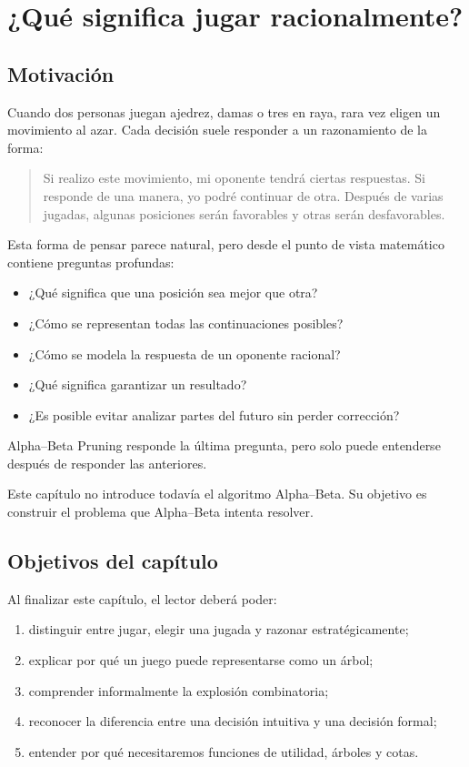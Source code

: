 \chapter{¿Qué significa jugar racionalmente?}

\section{Motivación}

Cuando dos personas juegan ajedrez, damas o tres en raya, rara vez eligen un movimiento al azar. Cada decisión suele responder a un razonamiento de la forma:

\begin{quote}
Si realizo este movimiento, mi oponente tendrá ciertas respuestas. Si responde de una manera, yo podré continuar de otra. Después de varias jugadas, algunas posiciones serán favorables y otras serán desfavorables.
\end{quote}

Esta forma de pensar parece natural, pero desde el punto de vista matemático contiene preguntas profundas:

\begin{itemize}
\item ¿Qué significa que una posición sea mejor que otra?
\item ¿Cómo se representan todas las continuaciones posibles?
\item ¿Cómo se modela la respuesta de un oponente racional?
\item ¿Qué significa garantizar un resultado?
\item ¿Es posible evitar analizar partes del futuro sin perder corrección?
\end{itemize}

Alpha--Beta Pruning responde la última pregunta, pero solo puede entenderse después de responder las anteriores.

\begin{summarybox}
Este capítulo no introduce todavía el algoritmo Alpha--Beta. Su objetivo es construir el problema que Alpha--Beta intenta resolver.
\end{summarybox}

\section{Objetivos del capítulo}

Al finalizar este capítulo, el lector deberá poder:

\begin{enumerate}
\item distinguir entre jugar, elegir una jugada y razonar estratégicamente;
\item explicar por qué un juego puede representarse como un árbol;
\item comprender informalmente la explosión combinatoria;
\item reconocer la diferencia entre una decisión intuitiva y una decisión formal;
\item entender por qué necesitaremos funciones de utilidad, árboles y cotas.
\end{enumerate}


